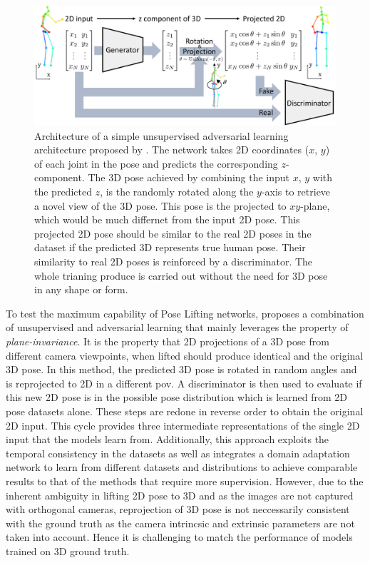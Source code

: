 \begin{figure}[!h]
    \centering
    \includegraphics[width=\linewidth]{figures/background/adverserial_arch.pdf}
    \caption{Architecture of a simple unsupervised adversarial learning architecture proposed by \cite{unsupervisedAdversarial}. The network takes 2D coordinates ($x$, $y$) of each joint in the pose and predicts the corresponding $z$-component. The 3D pose achieved by combining the input $x$, $y$ with the predicted $z$, is the randomly rotated along the $y$-axis to retrieve a novel view of the 3D pose. This pose is the projected to $xy$-plane, which would be much differnet from the input 2D pose. This projected 2D pose should be similar to the real 2D poses in the dataset if the predicted 3D represents true human pose. Their similarity to real 2D poses is reinforced by a discriminator. The whole trianing produce is carried out without the need for 3D pose in any shape or form.}
    \label{fig:adverserial_arch}
\end{figure}

To test the maximum capability of Pose Lifting networks, \cite{amazon1} proposes a combination of unsupervised and adversarial learning that mainly leverages the property of \textit{plane-invariance}. It is the property that 2D projections of a 3D pose from different camera viewpoints, when lifted should produce identical and the original 3D pose. In this method, the predicted 3D pose is rotated in random angles and is reprojected to 2D in a different \ac{pov}. A discriminator is then used to evaluate if this new 2D pose is in the possible pose distribution which is learned from 2D pose datasets alone. These steps are redone in reverse order to obtain the original 2D input. This cycle provides three intermediate representations of the single 2D input that the models learn from. Additionally, this approach exploits the temporal consistency in the datasets as well as integrates a domain adaptation network to learn from different datasets and distributions to achieve comparable results to that of the methods that require more supervision. However, due to the inherent ambiguity in lifting 2D pose to 3D and as the images are not captured with orthogonal cameras, reprojection of 3D pose is not neccessarily consistent with the ground truth as the camera intrincsic and extrinsic parameters are not taken into account. Hence it is challenging to match the performance of models trained on 3D ground truth.

